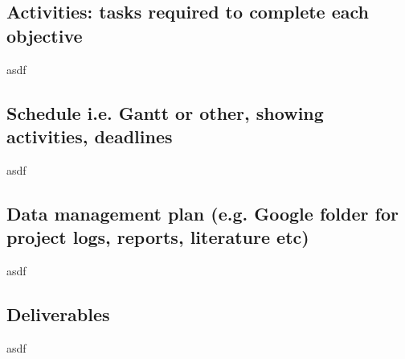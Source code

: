 \documentclass[12pt]{article}
\begin{document}
\subsection{Activities: tasks required to complete each objective}
asdf
\subsection{Schedule i.e. Gantt or other, showing activities, deadlines}
asdf
\subsection{Data management plan (e.g. Google folder for project logs, reports, literature etc)}
asdf
\subsection{Deliverables}
asdf




\pagebreak

\printglossary[type=\acronymtype]
\printglossary

\pagebreak



\end{document}
